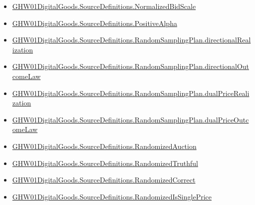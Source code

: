 \documentclass[10pt]{article}
\begin{document}
\begin{itemize}[leftmargin=1.2em]
\begin{itemize}[leftmargin=1.2em]
\item \hyperlink{paper-prerequisite-270356bcc95c8c06}{GHW01\allowbreak{}Digital\allowbreak{}Goods.\allowbreak{}Source\allowbreak{}Definitions.\allowbreak{}Normalized\allowbreak{}Bid\allowbreak{}Scale}
\item \hyperlink{paper-prerequisite-a8a274aca4bec0b9}{GHW01\allowbreak{}Digital\allowbreak{}Goods.\allowbreak{}Source\allowbreak{}Definitions.\allowbreak{}Positive\allowbreak{}Alpha}
\item \hyperlink{paper-prerequisite-1016e0b2f24b9e44}{GHW01\allowbreak{}Digital\allowbreak{}Goods.\allowbreak{}Source\allowbreak{}Definitions.\allowbreak{}Random\allowbreak{}Sampling\allowbreak{}Plan.\allowbreak{}directional\allowbreak{}Realization}
\item \hyperlink{paper-prerequisite-f583834499457af5}{GHW01\allowbreak{}Digital\allowbreak{}Goods.\allowbreak{}Source\allowbreak{}Definitions.\allowbreak{}Random\allowbreak{}Sampling\allowbreak{}Plan.\allowbreak{}directional\allowbreak{}Outcome\allowbreak{}Law}
\item \hyperlink{paper-prerequisite-855c06a94b84bb1c}{GHW01\allowbreak{}Digital\allowbreak{}Goods.\allowbreak{}Source\allowbreak{}Definitions.\allowbreak{}Random\allowbreak{}Sampling\allowbreak{}Plan.\allowbreak{}dual\allowbreak{}Price\allowbreak{}Realization}
\item \hyperlink{paper-prerequisite-7aa7244623a98a1d}{GHW01\allowbreak{}Digital\allowbreak{}Goods.\allowbreak{}Source\allowbreak{}Definitions.\allowbreak{}Random\allowbreak{}Sampling\allowbreak{}Plan.\allowbreak{}dual\allowbreak{}Price\allowbreak{}Outcome\allowbreak{}Law}
\item \hyperlink{paper-prerequisite-093498a5a1839250}{GHW01\allowbreak{}Digital\allowbreak{}Goods.\allowbreak{}Source\allowbreak{}Definitions.\allowbreak{}Randomized\allowbreak{}Auction}
\item \hyperlink{paper-prerequisite-24b555eb0370a69e}{GHW01\allowbreak{}Digital\allowbreak{}Goods.\allowbreak{}Source\allowbreak{}Definitions.\allowbreak{}Randomized\allowbreak{}Truthful}
\item \hyperlink{paper-prerequisite-878b8b007cc0e5d6}{GHW01\allowbreak{}Digital\allowbreak{}Goods.\allowbreak{}Source\allowbreak{}Definitions.\allowbreak{}Randomized\allowbreak{}Correct}
\item \hyperlink{paper-prerequisite-7dae05fb89eafa92}{GHW01\allowbreak{}Digital\allowbreak{}Goods.\allowbreak{}Source\allowbreak{}Definitions.\allowbreak{}Randomized\allowbreak{}Is\allowbreak{}Single\allowbreak{}Price}

\end{itemize}
\end{itemize}
\end{document}
